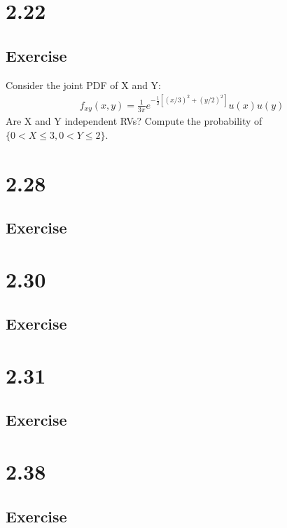 \documentclass[12pt]{article}
\begin{document}
\section{2.22}
\subsection{Exercise}
Consider the joint PDF of X and Y:\\
\begin{align*}
f_{xy}(x,y)=\frac{1}{3\pi}e^{-\frac{1}{2}[(x/3)^2+(y/2)^2]}u(x)u(y)
\end{align*}
Are X and Y independent RVs? Compute the probability of $\{0<X\leq3, 0<Y\leq2\}$.


\section{2.28}
\subsection{Exercise}

\section{2.30}
\subsection{Exercise}

\section{2.31}
\subsection{Exercise}

\section{2.38}
\subsection{Exercise}
\end{document}
